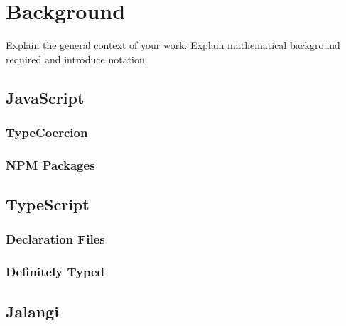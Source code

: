 \chapter{Background}\label{chap:background}
Explain the general context of your work.
Explain mathematical background required and introduce notation.

\section{JavaScript} \label{sec:background-javascript}







\subsection{TypeCoercion} \label{sec:background-js-type-coercion}
\subsection{NPM Packages} \label{sec:background-npm-packages}


\section{TypeScript} \label{sec:background-typescript}
\subsection{Declaration Files} \label{sec:declaration-files-background}
\subsection{Definitely Typed}

\section{Jalangi} \label{sec:jalangi}